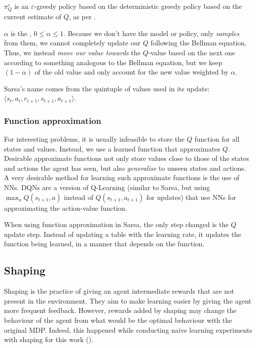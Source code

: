 $\pi^\varepsilon_Q$ is an $\varepsilon$-greedy policy based on
the deterministic greedy policy based on the current estimate of $Q$, as per
.

$\alpha$ is the , $0\leq\alpha\leq 1$. Because we
don't have the model or policy, only \emph{samples} from them, we cannot
completely update our $Q$ following the Bellman equation. Thus, we instead
\emph{move our value towards} the $Q$-value based on the next one according to
something analogous to the Bellman equation, but we keep $(1-\alpha)$ of the old
value and only account for the new value weighted by $\alpha$.

Sarsa's name comes from the quintuple of values used in its update:
$\langle s_t, a_t, r_{t+1}, s_{t+1}, a_{t+1}\rangle$.

\citep[Section~6.4]{sutton1998introduction}

\subsubsection{Function approximation}
For interesting problems, it is usually infeasible to store the $Q$ function for
all states and values. Instead, we use a learned function that approximates $Q$.
Desirable approximate functions not only store values close to those of the states and
actions the agent has seen, but also \emph{generalise} to unseen states and
actions. A very desirable method for learning such approximate functions is the
use of \acfp{NN}. \acfp{DQN} \citep{mnih2015human} are a version of Q-Learning
(similar to Sarsa, but using $\max_a Q(s_{t+1},a)$ instead of $Q(s_{t+1},
a_{t+1})$ for updates) that use \acp{NN} for approximating the action-value
function.

When using function approximation in Sarsa, the only step changed is the $Q$
update step. Instead of updating a table with the learning rate, it updates the
function being learned, in a manner that depends on the function.

\subsection{Shaping\label{subsec:shaping}}
Shaping is the practice of giving an agent intermediate rewards that are not
present in the environment. They aim to make learning easier by giving the agent
more frequent feedback. However, rewards added by shaping may change the
behaviour of the agent from what would be the optimal behaviour with the original
\ac{MDP}. Indeed, this happened while
conducting naive learning experiments with shaping for this work
().

